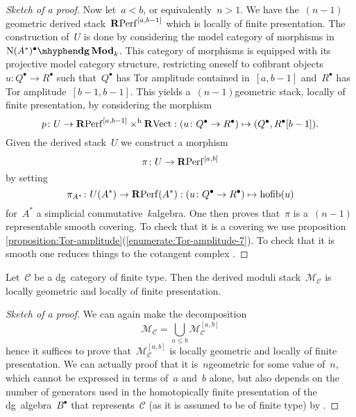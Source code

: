 \begin{refsection}
\begin{theorem}
\begin{proof}[Sketch of a proof]
    Now let~$a<b$, or equivalently~$n>1$. We have the~$(n-1)$\dash geometric derived stack~$\mathbf{R}\mathrm{Perf}^{[a,b-1]}$ which is locally of finite presentation. The construction of~$U$ is done by considering the model category of morphisms in~${\nerve(A^*)^\bullet}\mhyphen\dgMod_k$. This category of morphisms is equipped with its projective model category structure, restricting oneself to cofibrant objects~$u\colon Q^\bullet\to R^\bullet$ such that~$Q^\bullet$ has Tor amplitude contained in~$[a,b-1]$ and~$R^\bullet$ has Tor amplitude~$[b-1,b-1]$. This yields a~$(n-1)$\dash geometric stack, locally of finite presentation, by considering the morphism
    \begin{equation}
      p\colon U\to\mathbf{R}\mathrm{Perf}^{[a,b-1]}\times^{\mathrm{h}}\mathbf{R}\mathrm{Vect}:(u\colon Q^\bullet\to R^\bullet)\mapsto(Q^\bullet,R^\bullet[b-1]).
    \end{equation}
    Given the derived stack~$U$ we construct a morphism
    \begin{equation}
      \pi\colon U\to\mathbf{R}\mathrm{Perf}^{[a,b]}
    \end{equation}
    by setting
    \begin{equation}
      \pi_{A^*}\colon U(A^*)\to\mathbf{R}\mathrm{Perf}(A^*):(u\colon Q^\bullet\to R^\bullet)\mapsto\operatorname{hofib}(u)
    \end{equation}
    for~$A^*$ a simplicial commutative~$k$\dash algebra. One then proves that~$\pi$ is a~$(n-1)$\dash representable smooth covering. To check that it is a covering we use proposition \ref{proposition:Tor-amplitude}(\ref{enumerate:Tor-amplitude-7}). To check that it is smooth one reduces things to the cotangent complex \cite[corollary 2.2.5.3]{hagII}.
  \end{proof}
\end{theorem}

\begin{theorem}
  \label{theorem:main-theorem}
  Let~$\mathcal{C}$ be a dg~category of finite type. Then the derived moduli stack~$\mathcal{M}_{\mathcal{C}}$ is locally geometric and locally of finite presentation.

  \begin{proof}[Sketch of a proof]
    We can again make the decomposition
    \begin{equation}
      \mathcal{M}_{\mathcal{C}}=\bigcup_{a\leq b}\mathcal{M}_{\mathcal{C}}^{[a,b]}
    \end{equation}
    hence it suffices to prove that~$\mathcal{M}_{\mathcal{C}}^{[a,b]}$ is locally geometric and locally of finite presentation. We can actually proof that it is~$n$\dash geometric for some value of~$n$, which cannot be expressed in terms of~$a$ and~$b$ alone, but also depends on the number of generators used in the homotopically finite presentation of the dg~algebra~$B^\bullet$ that represents~$\mathcal{C}$ (as it is assumed to be of finite type) by \cite[corollary 2.12]{toen-vaquie}.


\end{proof}
\end{theorem}
\end{refsection}
